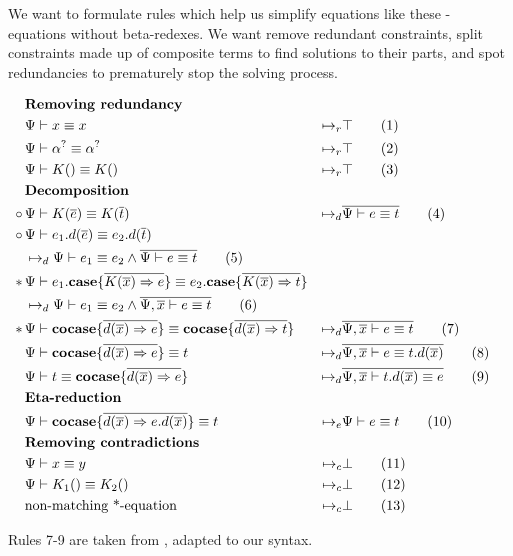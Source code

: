 \documentclass[twoside,12pt,a4paper]{article}
\begin{document}
We want to formulate rules which help us simplify equations like these - equations without beta-redexes.
We want remove redundant constraints, split constraints made up of composite terms to find solutions to their parts,
and spot redundancies to prematurely stop the solving process.
\begin{definition}
    \begin{align*}
    &\textbf{Removing redundancy}\\
    &\Psi \vdash x\equiv x&\mapsto_r&\top
    \tag{1}\\
    &\Psi \vdash \alpha^? \equiv \alpha^?&\mapsto_r& \top
    \tag{2}\\
    &\Psi \vdash K() \equiv K() &\mapsto_r& \top 
    \tag{3}\\
    &\textbf{Decomposition}\\
    \circ\,&\Psi\vdash K(\overline{e})\equiv K(\overline{t})&
    \mapsto_d&\overline{\Psi\vdash e\equiv t}
    \tag{4}\\
    \circ\,&\Psi \vdash e_1.d({\overline{e}})\equiv e_2.d({\overline{t}})
    \\ &\mapsto_d \Psi\vdash e_1 \equiv e_2 \wedge \overline{\Psi\vdash e\equiv t}
    \tag{5}\\
    *\,&\Psi \vdash e_1.\textbf{case}\{\overline{K(\overline{x})\Rightarrow e}\}\equiv e_2.\textbf{case}\{\overline{K(\overline{x})\Rightarrow t}\}
    \\ &\mapsto_d \Psi \vdash e_1 \equiv e_2\wedge \overline{\Psi, \overline{x}\vdash e\equiv t}
    \tag{6}\\
    *\, &\Psi\vdash \textbf{cocase}\{\overline{d(\overline{x})\Rightarrow e}\}\equiv 
    \textbf{cocase}\{\overline{d(\overline{x})\Rightarrow t}\}
    &\mapsto_d& \overline{\Psi, \overline{x}\vdash e \equiv t}
    \tag{7}\label{7}\\
    &\Psi\vdash \textbf{cocase}\{\overline{d(\overline{x})\Rightarrow e}\}\equiv t 
    &\mapsto_d& \overline{\Psi,\overline{x} \vdash e \equiv t.d(\overline{x})}
    \tag{8}\label{8}\\ 
    &\Psi\vdash t\equiv \textbf{cocase}\{\overline{d(\overline{x})\Rightarrow e}\} 
    &\mapsto_d& \overline{\Psi, \overline{x}\vdash t.d(\overline{x}) \equiv e}
    \tag{9}\label{9}\\
    &\textbf{Eta-reduction}\\
    & \Psi \vdash \textbf{cocase}\{\overline{d(\overline{x})\Rightarrow e.d(\overline{x})}\}\equiv t
    &\mapsto_e&\Psi\vdash e\equiv t
    \tag{10}\\
    &\textbf{Removing contradictions}\\ 
    &\Psi \vdash x\equiv y &\mapsto_c& \bot 
    \tag{11}\\   
    &\Psi \vdash K_1() \equiv K_2() &\mapsto_c& \bot 
    \tag{12}\\
    &\text{non-matching *-equation}&\mapsto_c&\bot
    \tag{13}\label{13}\\
    \end{align*}
\end{definition}
Rules 7-9 are taken from \cite{10.5555/2021953.2021960}, adapted to our syntax. 
\end{document}
